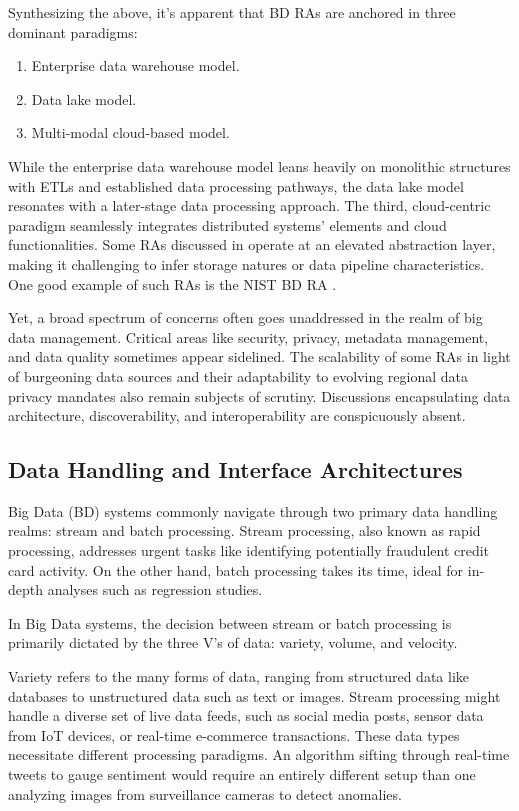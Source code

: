 \documentclass[conference]{IEEEtran}
\begin{document}
Synthesizing the above, it's apparent that BD RAs are anchored in three dominant paradigms:

\begin{enumerate}
    \item Enterprise data warehouse model.
    \item     Data lake model.
    \item     Multi-modal cloud-based model.
\end{enumerate}

While the enterprise data warehouse model leans heavily on monolithic structures with ETLs and established data processing pathways, the data lake model resonates with a later-stage data processing approach. The third, cloud-centric paradigm seamlessly integrates distributed systems’ elements and cloud functionalities. Some RAs discussed in \cite{b1} operate at an elevated abstraction layer, making it challenging to infer storage natures or data pipeline characteristics. One good example of such RAs is the NIST BD RA \cite{b3}.

Yet, a broad spectrum of concerns often goes unaddressed in the realm of big data management. Critical areas like security, privacy, metadata management, and data quality sometimes appear sidelined. The scalability of some RAs in light of burgeoning data sources and their adaptability to evolving regional data privacy mandates also remain subjects of scrutiny. Discussions encapsulating data architecture, discoverability, and interoperability are conspicuously absent. 

\subsection{Data Handling and Interface Architectures}

Big Data (BD) systems commonly navigate through two primary data handling realms: stream and batch processing. Stream processing, also known as rapid processing, addresses urgent tasks like identifying potentially fraudulent credit card activity. On the other hand, batch processing takes its time, ideal for in-depth analyses such as regression studies.

In Big Data systems, the decision between stream or batch processing is primarily dictated by the three V's of data: variety, volume, and velocity.

Variety refers to the many forms of data, ranging from structured data like databases to unstructured data such as text or images. Stream processing might handle a diverse set of live data feeds, such as social media posts, sensor data from IoT devices, or real-time e-commerce transactions. These data types necessitate different processing paradigms. An algorithm sifting through real-time tweets to gauge sentiment would require an entirely different setup than one analyzing images from surveillance cameras to detect anomalies.
\end{document}
